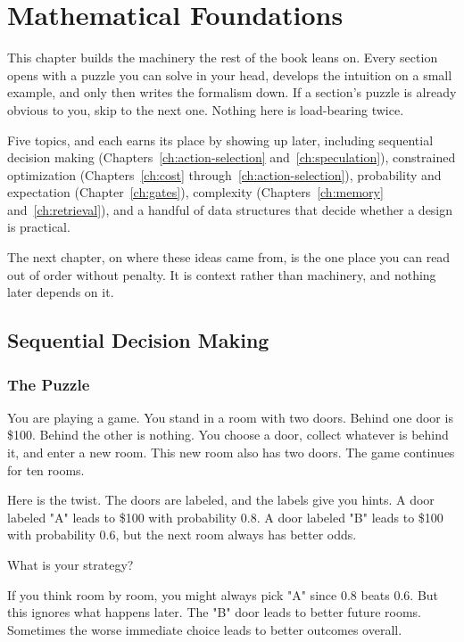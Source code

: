 \chapter{Mathematical Foundations}
\label{ch:math}

This chapter builds the machinery the rest of the book leans on. Every section opens with a puzzle you can solve in your head, develops the intuition on a small example, and only then writes the formalism down. If a section's puzzle is already obvious to you, skip to the next one. Nothing here is load-bearing twice.

Five topics, and each earns its place by showing up later, including sequential decision making (Chapters~\ref{ch:action-selection} and~\ref{ch:speculation}), constrained optimization (Chapters~\ref{ch:cost} through~\ref{ch:action-selection}), probability and expectation (Chapter~\ref{ch:gates}), complexity (Chapters~\ref{ch:memory} and~\ref{ch:retrieval}), and a handful of data structures that decide whether a design is practical.

The next chapter, on where these ideas came from, is the one place you can read out of order without penalty. It is context rather than machinery, and nothing later depends on it.

\section{Sequential Decision Making}

\subsection{The Puzzle}

You are playing a game. You stand in a room with two doors. Behind one door is \$100. Behind the other is nothing. You choose a door, collect whatever is behind it, and enter a new room. This new room also has two doors. The game continues for ten rooms.

Here is the twist. The doors are labeled, and the labels give you hints. A door labeled "A" leads to \$100 with probability 0.8. A door labeled "B" leads to \$100 with probability 0.6, but the next room always has better odds.

What is your strategy?

If you think room by room, you might always pick "A" since 0.8 beats 0.6. But this ignores what happens later. The "B" door leads to better future rooms. Sometimes the worse immediate choice leads to better outcomes overall.

